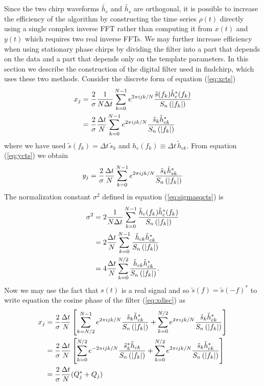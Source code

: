 Since the two chirp waveforms $\tilde{h_c}$ and $\tilde{h_s}$ are 
orthogonal, it is possible to increase the efficiency of the algorithm by
constructing the time series $\rho(t)$ directly using a single complex inverse
FFT rather than computing it from $x(t)$ and $y(t)$ which requires two real
inverse FFTs. We may further increase efficiency when using stationary phase
chirps by dividing the filter into a part that depends on the data and a part
that depends only on the template parameters. In this section we describe the
construction of the digital filter used in findchirp, which uses these two 
methods. Consider the discrete form of equation (\ref{eq:xcts})
\begin{equation}
\begin{split}
\label{eq:xdisc}
x_j &= \frac{2}{\sigma} \frac{1}{N\Delta t} \sum_{k=0}^{N-1} e^{2\pi ijk/N} 
\frac{\tilde{s}(f_k) \tilde{h}_{c}^\ast(f_k)}{S_n\left(\left|f_{k}\right|\right)} \\
&=
\frac{2}{\sigma} \frac{\Delta t}{N} \sum_{k=0}^{N-1} e^{2\pi ijk/N} 
\frac{\tilde{s}_k \tilde{h}_{ck}^\ast} {S_n\left(\left|f_{k}\right|\right)}
\end{split}
\end{equation}
where we have used $\tilde{s}(f_k) = \Delta t\, \tilde{s}_k$ and
${h}_c(f_k) \equiv \Delta t\, \tilde{h}_{ck}$. From equation
(\ref{eq:ycts}) we obtain
\begin{equation}
\label{eq:ydisc}
y_j = \frac{2}{\sigma} \frac{\Delta t}{N} \sum_{k=0}^{N-1} e^{2\pi ijk/N} 
\frac{\tilde{s}_k \tilde{h}_{sk}^\ast} {S_n\left(\left|f_{k}\right|\right)}
\end{equation}
The normalization constant $\sigma^2$ defined in equation
(\ref{eq:sigmasqcts}) is
\begin{equation}
\begin{split}
\label{eq:sigmasqdisc}
\sigma^2 &= 2 \frac{1}{N\Delta t} \sum_{k=0}^{N-1}
\frac{\tilde{h}_{c}(f_k)\tilde{h}_{c}^\ast(f_k)}{S_n\left(\left|f_{k}\right|\right)}  \\
&=
2 \frac{\Delta t}{N} \sum_{k=0}^{N-1}
\frac{\tilde{h}_{ck}\tilde{h}_{ck}^\ast}{S_n\left(\left|f_{k}\right|\right)} \\
&=
4 \frac{\Delta t}{N} \sum_{k=0}^{N/2}
\frac{\tilde{h}_{ck}\tilde{h}_{ck}^\ast}{S_n\left(\left|f_{k}\right|\right)}.
\end{split}
\end{equation}
Now we may use the fact that $s(t)$ is a real signal and so $\tilde{s}(f) = 
\tilde{s}(-f)^\ast$ to write equation the cosine phase of the filter 
(\ref{eq:xdisc}) as
\begin{equation}
\begin{split}
x_j &= 
\frac{2}{\sigma}\frac{\Delta t}{N}
\left[
  \sum_{k=N/2}^{N-1} e^{2\pi ijk/N} 
  \frac{\tilde{s}_k \tilde{h}_{ck}^\ast}{S_n\left(\left|f_{k}\right|\right)}
  +
  \sum_{k=0}^{N/2} e^{2\pi ijk/N} 
  \frac{\tilde{s}_k \tilde{h}_{ck}^\ast}{S_n\left(\left|f_{k}\right|\right)}
\right] \\
&= \frac{2}{\sigma}\frac{\Delta t}{N}
\left[
  \sum_{k=0}^{N/2} e^{-2\pi ijk/N} 
  \frac{\tilde{s}_k^\ast \tilde{h}_{ck}}{S_n\left(\left|f_{k}\right|\right)}
  +
  \sum_{k=0}^{N/2} e^{2\pi ijk/N} 
  \frac{\tilde{s}_k \tilde{h}_{ck}^\ast}{S_n\left(\left|f_{k}\right|\right)}
\right] \\
&= \frac{2}{\sigma}\frac{\Delta t}{N}(Q_j^\ast + Q_j)
\end{split}
\end{equation}
